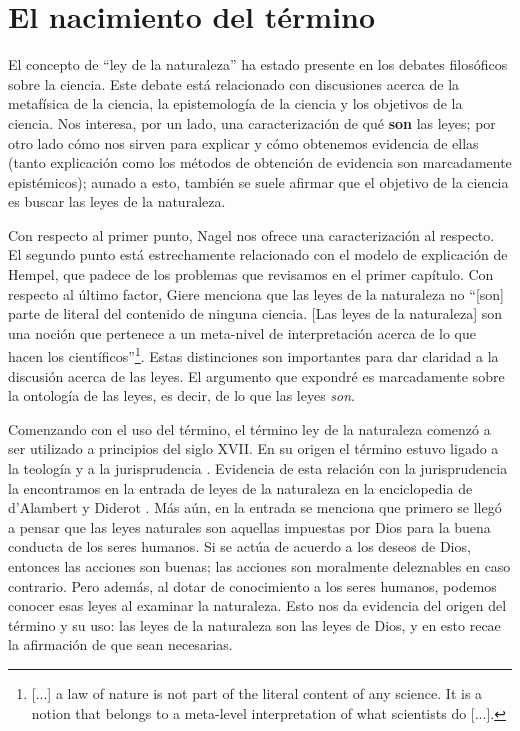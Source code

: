 \section{El nacimiento del término}

El concepto de ``ley de la naturaleza'' ha estado presente en los debates filosóficos sobre la ciencia. Este debate está relacionado con discusiones acerca de la metafísica de la ciencia, la epistemología de la ciencia y los objetivos de la ciencia. Nos interesa, por un lado, una caracterización de qué \textbf{son} las leyes; por otro lado cómo nos sirven para explicar y cómo obtenemos evidencia de ellas (tanto explicación como los métodos de obtención de evidencia son marcadamente epistémicos); aunado a esto, también se suele afirmar que el objetivo de la ciencia es buscar las leyes de la naturaleza.

Con respecto al primer punto, Nagel nos ofrece una caracterización al respecto. El segundo punto está estrechamente relacionado con el modelo de explicación de Hempel, que padece de los problemas que revisamos en el primer capítulo. Con respecto al último factor, Giere \citeyear[p. 69]{Giere2006} menciona que las leyes de la naturaleza no ``[son] parte de literal del contenido de ninguna ciencia. [Las leyes de la naturaleza] son una noción que pertenece a un meta-nivel de interpretación acerca de lo que hacen los científicos''\footnote{[...] a law of nature is not part of the literal content of any science. It is a notion that belongs to a meta-level interpretation of what scientists do [...].}. Estas distinciones son importantes para dar claridad a la discusión acerca de las leyes. El argumento que expondré es marcadamente sobre la ontología de las leyes, es decir, de lo que las leyes \textit{son}.

Comenzando con el uso del término, el término ley de la naturaleza comenzó a ser utilizado a principios del siglo XVII. En su origen el término estuvo ligado a la teología y a la jurisprudencia \cite{Giere2006, Giere1999}. Evidencia de esta relación con la jurisprudencia la encontramos en la entrada de leyes de la naturaleza en la enciclopedia de d'Alambert y Diderot \cite{lawna}. Más aún, en la entrada se menciona que primero se llegó a pensar que las leyes naturales son aquellas impuestas por Dios para la buena conducta de los seres humanos. Si se actúa de acuerdo a los deseos de Dios, entonces las acciones son buenas; las acciones son moralmente deleznables en caso contrario. Pero además, al dotar de conocimiento a los seres humanos, podemos conocer esas leyes al examinar la naturaleza. Esto nos da evidencia del origen del término y su uso: las leyes de  la naturaleza son las leyes de Dios, y en esto recae la afirmación de que sean necesarias.

